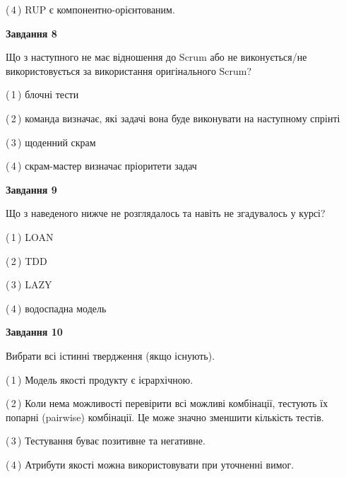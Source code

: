 \documentclass[10pt, ukrainian]{article}
\begin{document}
{\begin {large}
(\,4\,) RUP є компонентно-орієнтованим. %


{\begin {center}\textbf{Завдання 8}\end {center}}\par
Що з наступного не має відношення до Scrum або не виконується/не використовується за використання оригінального Scrum?\par
\vspace{2mm}



(\,1\,) блочні тести%



(\,2\,) команда визначає, які задачі вона буде виконувати на наступному спрінті%



(\,3\,) щоденний скрам%



(\,4\,) скрам-мастер визначає пріоритети задач%


{\begin {center}\textbf{Завдання 9}\end {center}}\par
Що з наведеного нижче не розглядалось та навіть не згадувалось у курсі?\par
\vspace{2mm}



(\,1\,) LOAN%



(\,2\,) TDD%



(\,3\,) LAZY%



(\,4\,) водоспадна модель%


{\begin {center}\textbf{Завдання 10}\end {center}}\par
Вибрати всі істинні твердження (якщо існують).\par
\vspace{2mm}



(\,1\,) Модель якості продукту є ієрархічною.%



(\,2\,) Коли нема можливості перевірити всі можливі комбінації, тестують їх попарні (pairwise) комбінації. Це може значно зменшити кількість тестів.%



(\,3\,) Тестування буває позитивне та негативне.%



(\,4\,) Атрибути якості можна використовувати при уточненні вимог.%



\end {large}}
\end{document}
